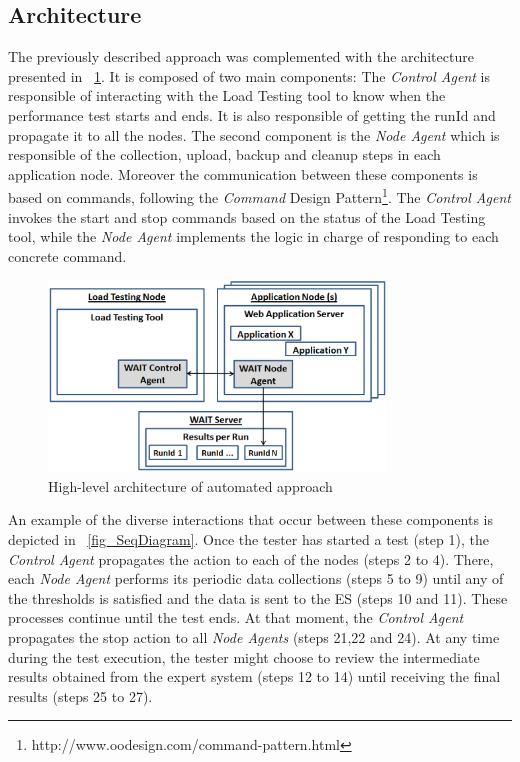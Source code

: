 \documentclass[runningheads,a4paper]{llncs}
\begin{document}
\subsection{Architecture}

The previously described approach was complemented with the architecture
presented in \figurename ~\ref{fig_Arch}. It is composed of two main components:
The \emph{Control Agent} is responsible of interacting with the Load
Testing tool to know when the performance test starts and ends. It is also
responsible of getting the runId and propagate it to all the nodes. The second
component is the \emph{Node Agent} which is responsible of the collection,
upload, backup and cleanup steps in each application node. Moreover the
communication between these components is based on commands, following the
\emph{Command} Design
Pattern\footnote{http://www.oodesign.com/command-pattern.html}. The
\emph{Control Agent} invokes the start and stop commands based on the status of
the Load Testing tool, while the \emph{Node Agent} implements the logic in
charge of responding to each concrete command.

\begin{figure}[!h]
\centering
\includegraphics[totalheight=.22\textheight,width=0.8\textwidth]{architecture_dwait}
\caption{High-level architecture of automated approach}
\label{fig_Arch}
\end{figure}

An example of the diverse interactions that occur between these
components is depicted in \figurename ~\ref{fig_SeqDiagram}. Once the tester has started a
test (step 1), the \emph{Control Agent} propagates the action to each of the nodes
(steps 2 to 4). There, each \emph{Node Agent} performs its periodic data 
collections (steps 5 to 9) until any of the thresholds is satisfied and the data
is sent to the ES (steps 10 and 11). These processes continue until the test
ends. At that moment, the \emph{Control Agent} propagates the stop action to all
\emph{Node Agents} (steps 21,22 and 24). At any time during the test execution,
the tester might choose to review the intermediate results obtained from the
expert system (steps 12 to 14) until receiving the final results (steps 25 to
27).
\end{document}

